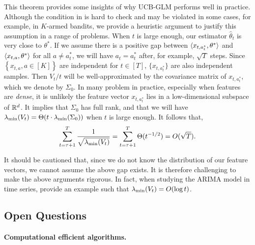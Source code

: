 This theorem provides some insights of why UCB-GLM performs well in practice.  Although the condition in  is hard to check and may be violated in some cases, for example, in $K$-armed bandits, we provide a heuristic argument to justify this assumption in a range of problems. When $t$ is large enough, our estimator $\hat{\theta}_t$ is very close to $\theta^*$. If we assume there is a positive gap between $\langle x_{t,a_t^*}, \theta^* \rangle$ and $\langle x_{t,a}, \theta^* \rangle$ for all $a \neq a_t^*$, we will have $a_t=a_t^*$ after, for example, $\sqrt{T}$ steps. Since $\left \{x_{t,a},a \in [K] \right \}$ are independent for $t \in [T]$, $\{x_{t,a_t^*}\}$ are also independent samples. Then $V_t/t$ will be well-approximated by the covariance matrix of $x_{t,a_t^*}$, which we denote by $\Sigma_0$.  In many problem in practice, especially when features are \emph{dense}, it is unlikely the feature vector $x_{t,a_t^*}$ lies in a low-dimensional subspace of $\mathbb{R}^d$.  It implies that $\Sigma_0$ has full rank, and that we will have $\lambda_{\min}(V_t)=\Theta(t \cdot \lambda_{\min}(\Sigma_0))$ when $t$ is large enough.  It follows that,
\begin{equation*} 
\sum_{t=\tau+1}^{T} \frac{1}{\sqrt{\lambda_{\min}(V_t)}} = \sum_{t=\tau+1}^{T} \Theta(t^{-1/2}) = O(\sqrt{T}).
\end{equation*}

It should be cautioned that, since we do not know the distribution of our feature vectors, we cannot assume the above gap exists.  It is therefore challenging to make the above arguments rigorous.
In fact, when studying the ARIMA model in time series, \citet[Example 1]{lai1982least} provide an example such that $\lambda_{\min}(V_t)=O(\log t)$.

\subsection{Open Questions}

\paragraph{Computational efficient algorithms.}

